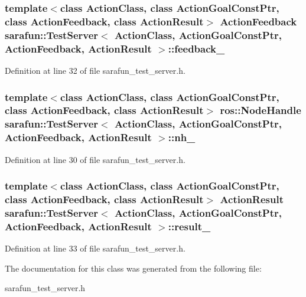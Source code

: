 \hypertarget{classsarafun_1_1TestServer_a3a94e11b8f3df03ad0333d1630048861_a3a94e11b8f3df03ad0333d1630048861}{
\subsubsection[{feedback\-\_\-}]{\setlength{\rightskip}{0pt plus 5cm}template$<$class Action\-Class, class Action\-Goal\-Const\-Ptr, class Action\-Feedback, class Action\-Result$>$ Action\-Feedback {\bf sarafun\-::\-Test\-Server}$<$ Action\-Class, Action\-Goal\-Const\-Ptr, Action\-Feedback, Action\-Result $>$\-::feedback\-\_\-\hspace{0.3cm}{\ttfamily [private]}}}\label{classsarafun_1_1TestServer_a3a94e11b8f3df03ad0333d1630048861_a3a94e11b8f3df03ad0333d1630048861}


Definition at line 32 of file sarafun\-\_\-test\-\_\-server.\-h.

\hypertarget{classsarafun_1_1TestServer_ae6bf11c91109d481d20a450ae36cd304_ae6bf11c91109d481d20a450ae36cd304}{
\subsubsection[{nh\-\_\-}]{\setlength{\rightskip}{0pt plus 5cm}template$<$class Action\-Class, class Action\-Goal\-Const\-Ptr, class Action\-Feedback, class Action\-Result$>$ ros\-::\-Node\-Handle {\bf sarafun\-::\-Test\-Server}$<$ Action\-Class, Action\-Goal\-Const\-Ptr, Action\-Feedback, Action\-Result $>$\-::nh\-\_\-\hspace{0.3cm}{\ttfamily [private]}}}\label{classsarafun_1_1TestServer_ae6bf11c91109d481d20a450ae36cd304_ae6bf11c91109d481d20a450ae36cd304}


Definition at line 30 of file sarafun\-\_\-test\-\_\-server.\-h.

\hypertarget{classsarafun_1_1TestServer_a52902161986c5800f65df63cca4ca7a9_a52902161986c5800f65df63cca4ca7a9}{
\subsubsection[{result\-\_\-}]{\setlength{\rightskip}{0pt plus 5cm}template$<$class Action\-Class, class Action\-Goal\-Const\-Ptr, class Action\-Feedback, class Action\-Result$>$ Action\-Result {\bf sarafun\-::\-Test\-Server}$<$ Action\-Class, Action\-Goal\-Const\-Ptr, Action\-Feedback, Action\-Result $>$\-::result\-\_\-\hspace{0.3cm}{\ttfamily [private]}}}\label{classsarafun_1_1TestServer_a52902161986c5800f65df63cca4ca7a9_a52902161986c5800f65df63cca4ca7a9}


Definition at line 33 of file sarafun\-\_\-test\-\_\-server.\-h.



The documentation for this class was generated from the following file\-:\begin{DoxyCompactItemize}
\item 
sarafun\-\_\-test\-\_\-server.\-h\end{DoxyCompactItemize}
